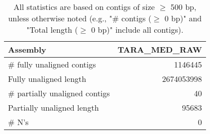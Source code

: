 \documentclass[12pt,a4paper]{article}
\begin{document}
\begin{table}[ht]
\begin{center}
\caption{All statistics are based on contigs of size $\geq$ 500 bp, unless otherwise noted (e.g., "\# contigs ($\geq$ 0 bp)" and "Total length ($\geq$ 0 bp)" include all contigs).}
\begin{tabular}{|l*{1}{|r}|}
\hline
Assembly & TARA\_MED\_RAW \\ \hline
\# fully unaligned contigs & 1146445 \\ \hline
Fully unaligned length & 2674053998 \\ \hline
\# partially unaligned contigs & 40 \\ \hline
Partially unaligned length & 95683 \\ \hline
\# N's & 0 \\ \hline
\end{tabular}
\end{center}
\end{table}
\end{document}
